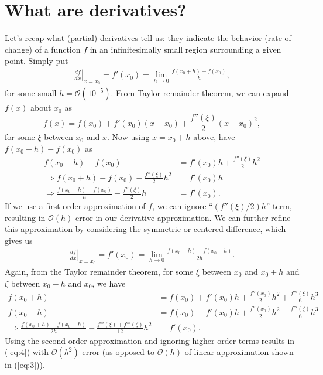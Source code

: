 \section{What are derivatives?}
\label{sec:2}

Let's recap what (partial) derivatives tell us: they indicate the behavior (rate of change) of a function $f$ in an infinitesimally small region surrounding a given point. Simply put
\begin{align}
\label{eq:3}
    \left.\frac{df}{dx}\right\vert_{x = x_0} = f'(x_0) = \lim_{h \rightarrow 0} \frac{f(x_0 + h) - f(x_0)}{h},
\end{align}
for some small $h = \mathcal{O}(10^{-5})$. From Taylor remainder theorem, we can expand $f(x)$ about $x_0$ as
$$
    f(x) = f(x_0) + f'(x_0) (x - x_0) + \frac{f''(\xi)}{2} (x - x_0)^2,
$$
for some $\xi$ between $x_0$ and $x$. Now using $x = x_0 + h$ above, have $f(x_0 + h) - f(x_0)$ as
\begin{align*}
    f(x_0 + h) - f(x_0) &= f'(x_0) h + \frac{f''(\xi)}{2} h^2 \\
    \Rightarrow f(x_0 + h) - f(x_0) - \frac{f''(\xi)}{2} h^2 &= f'(x_0) h \\
    \Rightarrow \frac{f(x_0 + h) - f(x_0)}{h} - \frac{f''(\xi)}{2} h &= f'(x_0).
\end{align*}
If we use a first-order approximation of $f$, we can ignore ``$(f''(\xi)/2) h$'' term, resulting in $\mathcal{O}(h)$ error in our derivative approximation. We can further refine this approximation by considering the symmetric or centered difference, which gives us
\begin{align}
\label{eq:4}
    \left.\frac{df}{dx}\right\vert_{x = x_0} = f'(x_0) = \lim_{h \rightarrow 0} \frac{f(x_0 + h) - f(x_0 - h)}{2h}.
\end{align}
Again, from the Taylor remainder theorem, for some $\xi$ between $x_0$ and $x_0 + h$ and $\zeta$ between $x_0 - h$ and $x_0$, we have
\begin{align*}
    f(x_0 + h) &= f(x_0) + f'(x_0) h + \frac{f''(x_0)}{2}h^2 + \frac{f'''(\xi)}{6}h^3 \\
    f(x_0 - h) &= f(x_0) - f'(x_0) h + \frac{f''(x_0)}{2}h^2 - \frac{f'''(\zeta)}{6}h^3 \\
    \Rightarrow \frac{f(x_0 + h) - f(x_0 - h)}{2h} - \frac{f'''(\xi) + f'''(\zeta)}{12} h^2 &= f'(x_0).
\end{align*}
Using the second-order approximation and ignoring higher-order terms results in (\ref{eq:4}) with $\mathcal{O}(h^2)$ error (as opposed to $\mathcal{O}(h)$ of linear approximation shown in (\ref{eq:3})).

